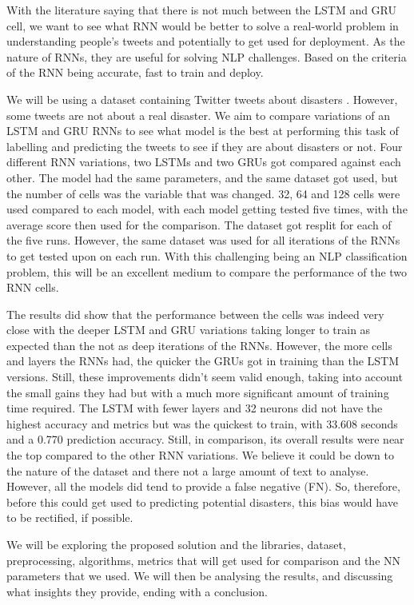 \documentclass[a4paper,10pt]{article}
\begin{document}
	With the literature saying that there is not much between the LSTM and GRU cell, we want to see what RNN would be better to solve a real-world problem in understanding people's tweets and potentially to get used for deployment. As the nature of RNNs, they are useful for solving NLP challenges. Based on the criteria of the RNN being accurate, fast to train and deploy.

	We will be using a dataset containing Twitter tweets about disasters \cite{disater_kaggle}. However, some tweets are not about a real disaster. We aim to compare variations of an LSTM and GRU RNNs to see what model is the best at performing this task of labelling and predicting the tweets to see if they are about disasters or not. Four different RNN variations, two LSTMs and two GRUs got compared against each other. The model had the same parameters, and the same dataset got used, but the number of cells was the variable that was changed. 32, 64 and 128 cells were used compared to each model, with each model getting tested five times, with the average score then used for the comparison. The dataset got resplit for each of the five runs. However, the same dataset was used for all iterations of the RNNs to get tested upon on each run. With this challenging being an NLP classification problem, this will be an excellent medium to compare the performance of the two RNN cells. 
	
	The results did show that the performance between the cells was indeed very close with the deeper LSTM and GRU variations taking longer to train as expected than the not as deep iterations of the RNNs. However, the more cells and layers the RNNs had, the quicker the GRUs got in training than the LSTM versions. Still, these improvements didn't seem valid enough, taking into account the small gains they had but with a much more significant amount of training time required. The LSTM with fewer layers and 32 neurons did not have the highest accuracy and metrics but was the quickest to train, with 33.608 seconds and a 0.770 prediction accuracy. Still, in comparison, its overall results were near the top compared to the other RNN variations. We believe it could be down to the nature of the dataset and there not a large amount of text to analyse. However, all the models did tend to provide a false negative (FN). So, therefore, before this could get used to predicting potential disasters, this bias would have to be rectified, if possible.

	We will be exploring the proposed solution and the libraries, dataset, preprocessing, algorithms, metrics that will get used for comparison and the NN parameters that we used. We will then be analysing the results, and discussing what insights they provide, ending with a conclusion.
\end{document}
